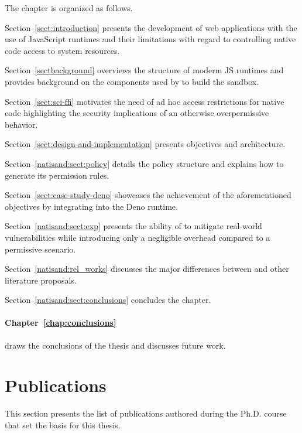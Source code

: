 \smallskip
\noindent The chapter is organized as follows.
\begin{compactitem}
    \item Section~\ref{sect:introduction} presents the development of
     web applications with the use of JavaScript runtimes and their
     limitations with regard to controlling native code access to
     system resources.
    \item Section~\ref{sectbackground} overviews the structure of
     moderm JS runtimes and provides background on the components
     used by \natisand to build the sandbox.
    \item Section~\ref{sect:sci-ffi} motivates the need of
     ad hoc access restrictions for native code highlighting the
     security implications of an otherwise overpermissive behavior.
    \item Section~\ref{sect:design-and-implementation} presents
     \natisand objectives and architecture.
    \item Section~\ref{natisand:sect:policy} details the policy
     structure and explains how to generate its permission rules.
    \item Section~\ref{sect:case-study-deno} showcases the achievement
     of the aforementioned objectives by integrating \natisand into
     the Deno runtime.
    \item Section~\ref{natisand:sect:exp} presents the ability of
     \natisand to mitigate real-world vulnerabilities while
     introducing only a negligible overhead compared to a permissive
     scenario.
    \item Section~\ref{natisand:rel_works} discusses the major
     differences between \natisand and other literature proposals.
    \item Section~\ref{natisand:sect:conclusions} concludes the chapter.
\end{compactitem}
\medskip

\paragraph*{Chapter~\ref{chap:conclusions}} draws the conclusions of
the thesis and discusses future work.

\section{Publications}

This section presents the list of publications authored during the
Ph.D. course that set the basis for this thesis.


